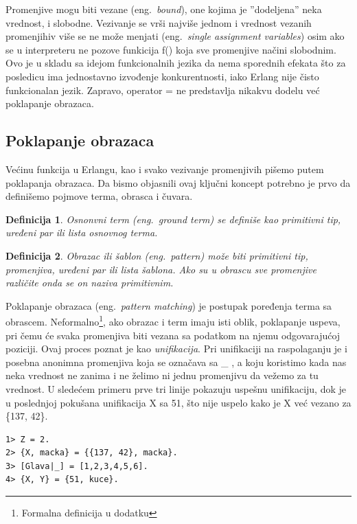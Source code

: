 \documentclass[a4paper]{article}
\newtheorem{definition}{Definicija}
\begin{document}
{Promenjive mogu biti vezane (eng.~{\em bound}), one kojima je ''dodeljena'' neka vrednost, i slobodne. 
Vezivanje se vrši najviše jednom i vrednost vezanih promenjihiv više se ne može menjati (eng.~{\em single assignment variables}) osim ako se u interpreteru ne pozove funkicija f() koja sve promenjive načini slobodnim. 
Ovo je u skladu sa idejom funkcionalnih jezika da nema sporednih efekata što za posledicu ima jednostavno izvođenje konkurentnosti, iako Erlang nije čisto funkcionalan jezik.
Zapravo, operator = ne predstavlja nikakvu dodelu već poklapanje obrazaca.


\subsection{Poklapanje obrazaca}
Većinu funkcija u Erlangu, kao i svako vezivanje promenjivih pišemo putem poklapanja obrazaca. 
Da bismo objasnili ovaj ključni koncept potrebno je prvo da definišemo pojmove terma, obrasca i čuvara.

\theoremstyle{definition}
\begin{definition}{Osnonvni term (eng.~{\em ground term})}
se definiše kao primitivni tip, uređeni par ili lista osnovnog terma.
\end{definition}

\begin{definition}{Obrazac ili šablon (eng.~{\em pattern})}
može biti primitivni tip, promenjiva, uređeni par ili lista šablona.
Ako su u obrascu sve promenjive različite onda se on naziva primitivnim.
\end{definition}

Poklapanje obrazaca (eng.~{\em pattern matching}) je postupak poređenja terma sa obrascem. 
Neformalno\footnote{Formalna definicija u dodatku}, ako obrazac i term imaju isti oblik, poklapanje uspeva, pri čemu će svaka promenjiva biti vezana sa podatkom na njemu odgovarajućoj poziciji. 
Ovaj proces poznat je kao {\em unifikacija}. 
Pri unifikaciji na raspolaganju je i posebna anonimna promenjiva koja se označava sa \_ , a koju koristimo kada nas neka vrednost ne zanima i ne želimo ni jednu promenjivu da vežemo za tu vrednost. U sledećem primeru prve tri linije pokazuju uspešnu unifikaciju, dok je u poslednjoj pokušana unifikacija X sa 51, što nije uspelo kako je X već vezano za \{137, 42\}.

\begin{verbatim}
1> Z = 2.
2> {X, macka} = {{137, 42}, macka}.
3> [Glava|_] = [1,2,3,4,5,6].
4> {X, Y} = {51, kuce}.
\end{verbatim}

}
\end{document}
